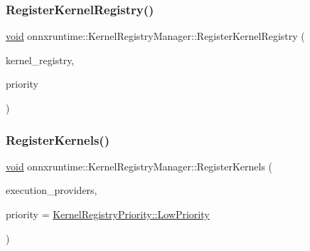 \subsubsection{\texorpdfstring{Register\+Kernel\+Registry()}{RegisterKernelRegistry()}}
{\footnotesize\ttfamily \mbox{\hyperlink{mlasi_8h_a88f941d423cb2a819b70a1358982b1a6}{void}} onnxruntime\+::\+Kernel\+Registry\+Manager\+::\+Register\+Kernel\+Registry (\begin{DoxyParamCaption}\item[{std\+::shared\+\_\+ptr$<$ \mbox{\hyperlink{classonnxruntime_1_1KernelRegistry}{Kernel\+Registry}} $>$}]{kernel\+\_\+registry,  }\item[{\mbox{\hyperlink{namespaceonnxruntime_afa2fd0cbc7f0bae88fb9bfe75319a5a4}{Kernel\+Registry\+Priority}}}]{priority }\end{DoxyParamCaption})}

\mbox{\label{classonnxruntime_1_1KernelRegistryManager_abecffc9d198c1af9660a9f2582ed6e2f}} 
\subsubsection{\texorpdfstring{Register\+Kernels()}{RegisterKernels()}}
{\footnotesize\ttfamily \mbox{\hyperlink{mlasi_8h_a88f941d423cb2a819b70a1358982b1a6}{void}} onnxruntime\+::\+Kernel\+Registry\+Manager\+::\+Register\+Kernels (\begin{DoxyParamCaption}\item[{const \mbox{\hyperlink{classonnxruntime_1_1ExecutionProviders}{Execution\+Providers}} \&}]{execution\+\_\+providers,  }\item[{\mbox{\hyperlink{namespaceonnxruntime_afa2fd0cbc7f0bae88fb9bfe75319a5a4}{Kernel\+Registry\+Priority}}}]{priority = {\ttfamily \mbox{\hyperlink{namespaceonnxruntime_afa2fd0cbc7f0bae88fb9bfe75319a5a4a0fc33710ab0ebbd6d1fcff0bc6cc7f3d}{Kernel\+Registry\+Priority\+::\+Low\+Priority}}} }\end{DoxyParamCaption})}

\mbox{\label{classonnxruntime_1_1KernelRegistryManager_a377a661b24ec010403b2ce431d5f3e8c}} 
